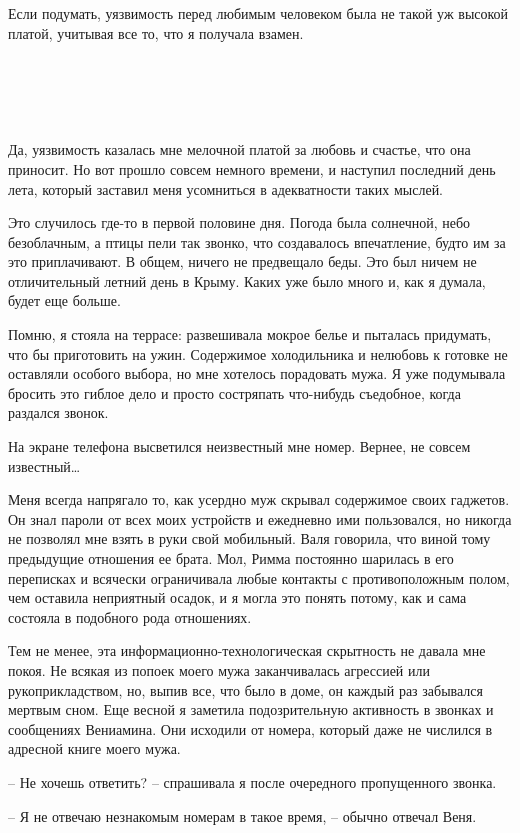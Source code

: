 \documentclass[
]{book}
\begin{document}
Если подумать, уязвимость перед любимым человеком была не такой уж высокой платой, учитывая все то, что я получала взамен.

\hypertarget{chapter-74}{%
\chapter{~}\label{chapter-74}}

Да, уязвимость казалась мне мелочной платой за любовь и счастье, что она приносит. Но вот прошло совсем немного времени, и наступил последний день лета, который заставил меня усомниться в адекватности таких мыслей.

Это случилось где-то в первой половине дня. Погода была солнечной, небо безоблачным, а птицы пели так звонко, что создавалось впечатление, будто им за это приплачивают. В общем, ничего не предвещало беды. Это был ничем не отличительный летний день в Крыму. Каких уже было много и, как я думала, будет еще больше.

Помню, я стояла на террасе: развешивала мокрое белье и пыталась придумать, что бы приготовить на ужин. Содержимое холодильника и нелюбовь к готовке не оставляли особого выбора, но мне хотелось порадовать мужа. Я уже подумывала бросить это гиблое дело и просто состряпать что-нибудь съедобное, когда раздался звонок.

На экране телефона высветился неизвестный мне номер. Вернее, не совсем известный\ldots{}

Меня всегда напрягало то, как усердно муж скрывал содержимое своих гаджетов. Он знал пароли от всех моих устройств и ежедневно ими пользовался, но никогда не позволял мне взять в руки свой мобильный. Валя говорила, что виной тому предыдущие отношения ее брата. Мол, Римма постоянно шарилась в его переписках и всячески ограничивала любые контакты с противоположным полом, чем оставила неприятный осадок, и я могла это понять потому, как и сама состояла в подобного рода отношениях.

Тем не менее, эта информационно-технологическая скрытность не давала мне покоя. Не всякая из попоек моего мужа заканчивалась агрессией или рукоприкладством, но, выпив все, что было в доме, он каждый раз забывался мертвым сном. Еще весной я заметила подозрительную активность в звонках и сообщениях Вениамина. Они исходили от номера, который даже не числился в адресной книге моего мужа.

-- Не хочешь ответить? -- спрашивала я после очередного пропущенного звонка.

-- Я не отвечаю незнакомым номерам в такое время, -- обычно отвечал Веня.
\end{document}
